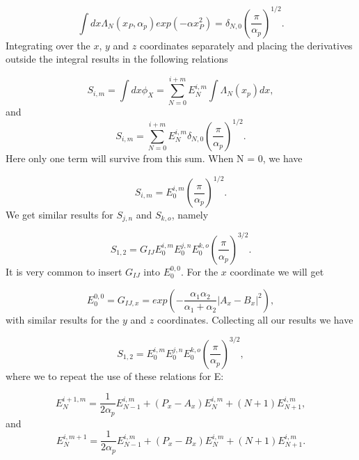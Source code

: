 \documentclass[a4paper,norsk,11pt,twoside]{report}
\begin{document}
\begin{equation}
\int dx \Lambda_N(x_P, \alpha_p) exp(-\alpha x_P^2) = \delta_{N,0} \left( \frac{\pi}{\alpha_p} \right)^{1/2} 
.
\end{equation}
Integrating over the $x$, $y$ and $z$ coordinates separately and placing the derivatives outside the integral results in
 the following relations

\begin{equation}
S_{i,m} = \int dx \phi_X = \sum_{N=0}^{i+m} E_N^{i,m} \int \Lambda_N(x_p) dx ,
\end{equation}
and 
\begin{equation}
S_{i,m} = \sum_{N=0}^{i+m} E_N^{i,m} \delta_{N,0} \left( \frac{\pi}{\alpha_p} \right)^{1/2} .
\end{equation}
Here only one term will survive from this sum. When N = 0, we have 

\begin{equation}
S_{i,m} = E_0^{i,m} \left( \frac{\pi}{\alpha_p} \right)^{1/2} .
\end{equation}
We get similar results for $S_{j,n}$ and $S_{k,o}$, namely

\begin{equation}
S_{1,2} = G_{IJ} E_0^{i,m} E_0^{j,n} E_0^{k,o} \left( \frac{\pi}{\alpha_p} \right)^{3/2} .
\end{equation}
It is very common to insert $G_{IJ}$ into $E_0^{0,0}$. For the $x$ coordinate we will get 

\begin{equation}
E_0^{0,0} = G_{IJ,x} = exp\left(-\frac{\alpha_1 \alpha_2}{\alpha_1 + \alpha_2} |A_x - B_x|^2\right) ,
\label{important_hf1}
\end{equation}
with similar results for the $y$ and $z$ coordinates. Collecting all our results we have

\begin{equation}
S_{1,2} = E_0^{i,m} E_0^{j,n} E_0^{k,o} \left( \frac{\pi}{\alpha_p} \right)^{3/2} , \label{overlap_integral}
\end{equation}
where we to repeat the use of these relations for E:

\begin{equation}
E_N^{i+1, m} = \frac{1}{2\alpha_p} E_{N-1}^{i,m} + (P_x - A_x) E_N^{i,m} + (N + 1) E_{N+1}^{i,m} , \label{important_hf2}
\end{equation}
and
\begin{equation}
E_N^{i, m+1} = \frac{1}{2\alpha_p} E_{N-1}^{i,m} + (P_x - B_x) E_N^{i,m} + (N + 1) E_{N+1}^{i,m} . \label{important_hf3}
\end{equation}
\end{document}
